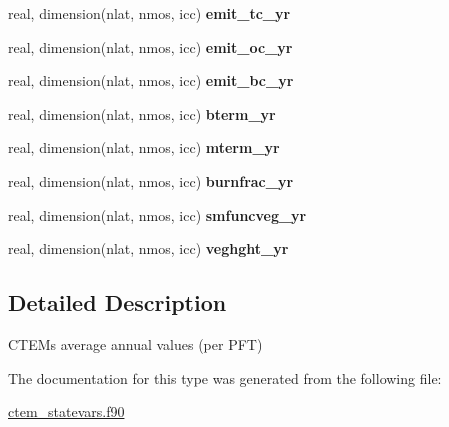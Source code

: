 \begin{DoxyCompactItemize}
\item 
\hypertarget{structctem__statevars_1_1ctem__annual_a8d4044ad2c59d9711d9aad15052e9d12}{}real, dimension(nlat, nmos, icc) {\bfseries emit\+\_\+tc\+\_\+yr}\label{structctem__statevars_1_1ctem__annual_a8d4044ad2c59d9711d9aad15052e9d12}

\item 
\hypertarget{structctem__statevars_1_1ctem__annual_ab2b4ee9cd3e1e310e5068218aec3c9c1}{}real, dimension(nlat, nmos, icc) {\bfseries emit\+\_\+oc\+\_\+yr}\label{structctem__statevars_1_1ctem__annual_ab2b4ee9cd3e1e310e5068218aec3c9c1}

\item 
\hypertarget{structctem__statevars_1_1ctem__annual_a1f62b2473cbc3fa1d312b2676ad56faf}{}real, dimension(nlat, nmos, icc) {\bfseries emit\+\_\+bc\+\_\+yr}\label{structctem__statevars_1_1ctem__annual_a1f62b2473cbc3fa1d312b2676ad56faf}

\item 
\hypertarget{structctem__statevars_1_1ctem__annual_a56465042b29896a26c3b72686cc69382}{}real, dimension(nlat, nmos, icc) {\bfseries bterm\+\_\+yr}\label{structctem__statevars_1_1ctem__annual_a56465042b29896a26c3b72686cc69382}

\item 
\hypertarget{structctem__statevars_1_1ctem__annual_a9d25f2fbd463c47e824223910e8ea400}{}real, dimension(nlat, nmos, icc) {\bfseries mterm\+\_\+yr}\label{structctem__statevars_1_1ctem__annual_a9d25f2fbd463c47e824223910e8ea400}

\item 
\hypertarget{structctem__statevars_1_1ctem__annual_aa360fac159dc1c4ef9d9569c7947ac55}{}real, dimension(nlat, nmos, icc) {\bfseries burnfrac\+\_\+yr}\label{structctem__statevars_1_1ctem__annual_aa360fac159dc1c4ef9d9569c7947ac55}

\item 
\hypertarget{structctem__statevars_1_1ctem__annual_a311c08a8e32c15f71d53f18d20745470}{}real, dimension(nlat, nmos, icc) {\bfseries smfuncveg\+\_\+yr}\label{structctem__statevars_1_1ctem__annual_a311c08a8e32c15f71d53f18d20745470}

\item 
\hypertarget{structctem__statevars_1_1ctem__annual_ae4c52bd3883e2cb3ba4ea930161c55a8}{}real, dimension(nlat, nmos, icc) {\bfseries veghght\+\_\+yr}\label{structctem__statevars_1_1ctem__annual_ae4c52bd3883e2cb3ba4ea930161c55a8}

\end{DoxyCompactItemize}


\subsection{Detailed Description}
C\+T\+E\+M\textquotesingle{}s average annual values (per P\+F\+T) 

The documentation for this type was generated from the following file\+:\begin{DoxyCompactItemize}
\item 
\hyperlink{ctem__statevars_8f90}{ctem\+\_\+statevars.\+f90}\end{DoxyCompactItemize}
